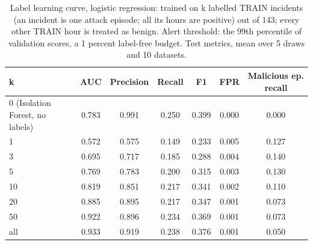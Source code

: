 \begin{table}[t]
\centering
\scriptsize
\caption{Label learning curve, logistic regression: trained on k labelled TRAIN incidents (an incident is one attack episode; all its hours are positive) out of 143; every other TRAIN hour is treated as benign. Alert threshold: the 99th percentile of validation scores, a 1 percent label-free budget. Test metrics, mean over 5 draws and 10 datasets.}
\label{tab:lc-logistic-b1}
\begin{tabular}{lcccccc}
\hline
k & AUC & Precision & Recall & F1 & FPR & Malicious ep. recall \\
\hline
0 (Isolation Forest, no labels) & 0.783 & 0.991 & 0.250 & 0.399 & 0.000 & 0.000 \\
1 & 0.572 & 0.575 & 0.149 & 0.233 & 0.005 & 0.127 \\
3 & 0.695 & 0.717 & 0.185 & 0.288 & 0.004 & 0.140 \\
5 & 0.769 & 0.783 & 0.200 & 0.315 & 0.003 & 0.130 \\
10 & 0.819 & 0.851 & 0.217 & 0.341 & 0.002 & 0.110 \\
20 & 0.885 & 0.895 & 0.217 & 0.347 & 0.001 & 0.073 \\
50 & 0.922 & 0.896 & 0.234 & 0.369 & 0.001 & 0.073 \\
all & 0.933 & 0.919 & 0.238 & 0.376 & 0.001 & 0.050 \\
\hline
\end{tabular}
\end{table}
